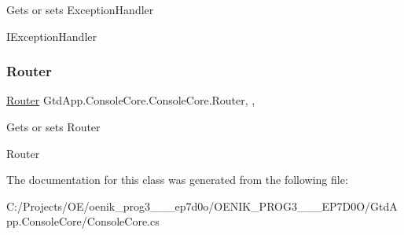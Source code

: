 Gets or sets Exception\+Handler 

I\+Exception\+Handler\mbox{\label{class_gtd_app_1_1_console_core_1_1_console_core_a2b8ade54798622cbd911fa709e120e61}} 
\subsubsection{\texorpdfstring{Router}{Router}}
{\footnotesize\ttfamily \mbox{\hyperlink{class_gtd_app_1_1_logic_1_1_routing_1_1_router}{Router}} Gtd\+App.\+Console\+Core.\+Console\+Core.\+Router\hspace{0.3cm}{\ttfamily [static]}, {\ttfamily [get]}, {\ttfamily [set]}}



Gets or sets Router 

Router

The documentation for this class was generated from the following file\+:\begin{DoxyCompactItemize}
\item 
C\+:/\+Projects/\+O\+E/oenik\+\_\+prog3\+\_\+\_\+\_\+ep7d0o/\+O\+E\+N\+I\+K\+\_\+\+P\+R\+O\+G3\+\_\+\_\+\_\+\+E\+P7\+D0\+O/\+Gtd\+App.\+Console\+Core/Console\+Core.\+cs\end{DoxyCompactItemize}
